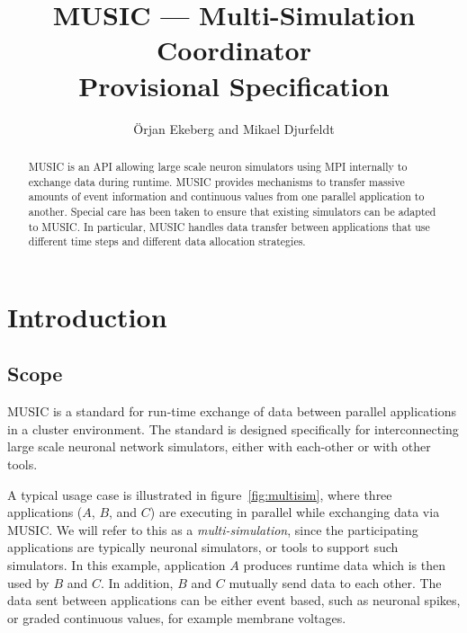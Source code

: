 \documentclass[a4paper]{report}
\begin{document}
\lstset{language=C++}

\title{MUSIC --- Multi-Simulation Coordinator\\
  Provisional Specification}

\author{Örjan Ekeberg and Mikael Djurfeldt}

\maketitle

\begin{abstract}
  MUSIC is an API allowing large scale neuron simulators using MPI
  internally to exchange data during runtime.  MUSIC provides
  mechanisms to transfer massive amounts of event information and
  continuous values from one parallel application to another.  Special
  care has been taken to ensure that existing simulators can be
  adapted to MUSIC.  In particular, MUSIC handles data transfer
  between applications that use different time steps and different
  data allocation strategies.
\end{abstract}


\tableofcontents

\listoffigures

\chapter{Introduction}

\section{Scope}

MUSIC is a standard for run-time exchange of data between parallel
applications in a cluster environment.  The standard is designed
specifically for interconnecting large scale neuronal network
simulators, either with each-other or with other tools.

A typical usage case is illustrated in figure~\ref{fig:multisim},
where three applications ($A$, $B$, and $C$) are executing in parallel
while exchanging data via MUSIC.  We will refer to this as a
\emph{multi-simulation}, since the participating applications are
typically neuronal simulators, or tools to support such simulators.
In this example, application $A$ produces runtime data which is then
used by $B$ and $C$.  In addition, $B$ and $C$ mutually send data to
each other.  The data sent between applications can be either event
based, such as neuronal spikes, or graded continuous values, for
example membrane voltages.
\end{document}
